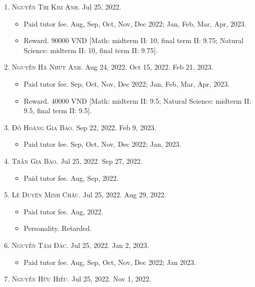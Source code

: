 \documentclass{article}
\begin{document}
\begin{enumerate}
	\item \textsc{Nguyễn Thị Kim Anh.} {\sf[In]} Jul 25, 2022.
	\begin{itemize}
		\item {\sf Paid tutor fee.} Aug, Sep, Oct, Nov, Dec 2022; Jan, Feb, Mar, Apr, 2023.
		\item {\sf Reward.} 90000 VND [Math: midterm II: 10, final term II: 9.75; Natural Science: midterm II: 10, final term II: 9.75].
	\end{itemize}
	\item \textsc{Nguyễn Hà Nhựt Anh.} {\sf[In]} Aug 24, 2022. {\sf[Re-In]} Oct 15, 2022. Feb 21, 2023.
	\begin{itemize}
		\item {\sf Paid tutor fee.} Sep, Oct, Nov, Dec 2022; Jan, Feb, Mar, Apr, 2023.
		\item {\sf Reward.} 40000 VND [Math: midterm II: 9.5; Natural Science: midterm II: 9.5, final term II: 9.5].
	\end{itemize}
	\item \textsc{Đỗ Hoàng Gia Bảo.} {\sf[In]} Sep 22, 2022. {\sf[Out]} Feb 9, 2023.
	\begin{itemize}
		\item {\sf Paid tutor fee.} Sep, Oct, Nov, Dec 2022; Jan, 2023.
	\end{itemize}
	\item \textsc{Trần Gia Bảo.} {\sf[In]} Jul 25, 2022. {\sf[Out]} Sep 27, 2022.
	\begin{itemize}
		\item {\sf Paid tutor fee.} Aug, Sep, 2022.
	\end{itemize}
	\item \textsc{Lê Duyên Minh Châu.} {\sf[In]} Jul 25, 2022. {\sf[Out]} Aug 29, 2022.
	\begin{itemize}
		\item {\sf Paid tutor fee.} Aug, 2022.
		\item {\sf Personality.} Retarded.
	\end{itemize}
	\item \textsc{Nguyễn Tâm Đắc.} {\sf[In]} Jul 25, 2022. {\sf[Out]} Jan 2, 2023.
	\begin{itemize}
		\item {\sf Paid tutor fee.} Aug, Sep, Oct, Nov, Dec 2022; Jan 2023.
	\end{itemize}
	\item \textsc{Nguyễn Hữu Hiếu.} {\sf[In]} Jul 25, 2022. {\sf[Out]} Nov 1, 2022.

\end{enumerate}
\end{document}

